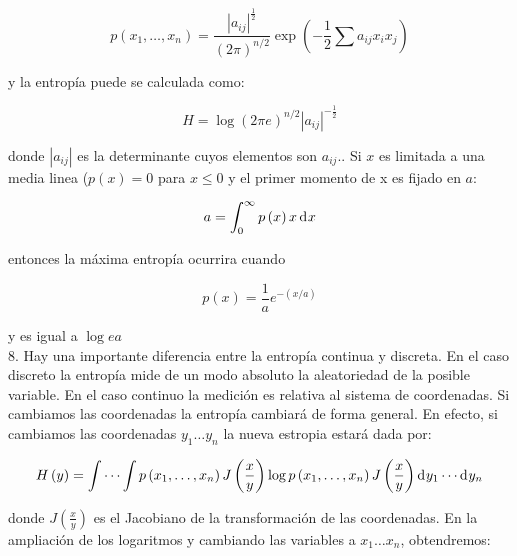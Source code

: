 \begin{equation}
p\left ( x_{1}, \ldots ,x_{n} \right )=\frac{\left | a_{ij} \right |^{\frac{1}{2}}}{\left ( 2\pi  \right )^{n/2}}\exp \left ( -\frac{1}{2} \sum a_{ij}x_{i}x_{j} \right)
\end{equation}

y la entrop\'ia puede se calculada como:

\begin{equation}
H=\log \left ( 2\pi e \right )^{n/2}\left | a_{ij} \right |^{-\frac{1}{2}}
\end{equation}

donde $\left |a_{ij}  \right | $ es la determinante cuyos elementos son $a_{ij}$.\newline {}. Si $x$ es limitada a una media linea ($p\left ( x \right )=0$ para $x\leq0$ y el primer momento de x es fijado en $a$:

\begin{equation}
a=\int_{0}^{\infty}p\left ( x \right )x \diff x 
\end{equation}

entonces la m\'axima entrop\'ia ocurrira cuando

\begin{equation}
p\left ( x \right )=\frac{1}{a}e^{-\left ( x/a \right )}
\end{equation}

y es igual a $\log ea$
\\

8. Hay una importante diferencia entre la entrop\'ia continua y discreta. En el caso discreto la entrop\'ia mide de un modo absoluto la aleatoriedad de la posible variable. En el caso continuo la medici\'on es relativa al sistema de coordenadas. Si cambiamos las coordenadas la entrop\'ia cambiar\'a de forma general. En efecto, si cambiamos las coordenadas $y_{1} \dots y_{n}$ la nueva estropia estar\'a dada por:

\begin{equation}
H\left ( y \right )=\int \cdots \int p\left ( x_{1}, \ldots ,x_{n} \right )J\left ( \frac{x}{y} \right )\log p\left ( x_{1}, \ldots ,x_{n} \right )J\left ( \frac{x}{y} \right ) \diff y _{1}\cdots  \diff y _{n}
\end{equation}

donde $J\left ( \frac{x}{y} \right )$ es el Jacobiano de la transformaci\'on de las coordenadas. En la ampliaci\'on de los logaritmos y cambiando las variables a $x_{1}\dots x_{n}$, obtendremos:

